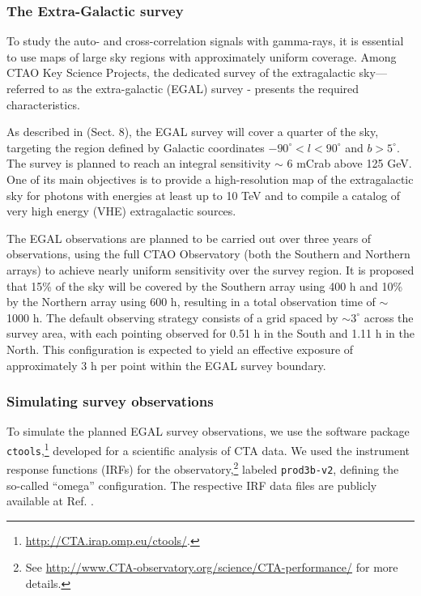 \subsubsection{The Extra-Galactic survey}

To study the auto- and cross-correlation signals with gamma-rays, {it is essential to use maps of large sky regions with approximately uniform coverage}. Among CTAO Key Science Projects, the dedicated survey of the extragalactic sky---referred to as the extra-galactic (EGAL) survey - presents the required characteristics.

As described in \cite{CTAConsortium:2017dvg} (Sect. 8), the EGAL survey will cover a quarter of the sky, targeting the region defined by Galactic coordinates $-90^\circ < l < 90^\circ$ and $b > 5^\circ$. The survey is planned to reach an integral sensitivity $\sim$ 6 mCrab above 125 GeV. One of its main objectives is to provide a high-resolution map of the extragalactic sky for photons with energies at least up to 10 TeV and to compile a catalog of very high energy (VHE) extragalactic sources.

The EGAL observations are planned to be carried out over three years of observations, using the full CTAO Observatory (both the Southern and Northern arrays) to achieve nearly uniform sensitivity over the survey region. It is proposed that 15\% of the sky will be covered by the Southern array using 400 h and 10\% by the Northern array using 600 h, resulting in a total observation time of $\sim$ 1000 h. The default {observing strategy consists of a grid spaced by $\sim 3^\circ$ across the survey area, with each pointing observed for 0.51 h in the South and 1.11 h in the North. This configuration is expected to yield an effective exposure of approximately 3 h per point within the EGAL survey boundary.} 

\subsubsection{Simulating survey observations}
To simulate the planned EGAL survey observations, we use the software package \texttt{ctools},\footnote{\url{http://CTA.irap.omp.eu/ctools/}.} developed for a scientific analysis of CTA data. 
We used the instrument response functions (IRFs) for the observatory,\footnote{See \url{http://www.CTA-observatory.org/science/CTA-performance/} for more details.} labeled \texttt{prod3b-v2}, defining the so-called ``omega'' configuration. The respective IRF data files are publicly available at Ref. \cite{zenodo_ctao}.

